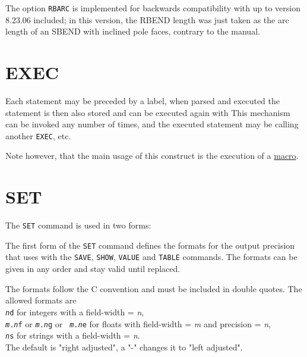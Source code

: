 The option {\tt RBARC} is implemented for backwards compatibility
with \madeight up to version 8.23.06 included; in this version, the
RBEND length was just taken as the arc length of an SBEND with inclined
pole faces, contrary to the \madeight manual.  




\section{EXEC}
\label{sec:exec}
Each statement may be preceded by a label, when parsed and executed the
statement is then also stored and can be executed again with
This mechanism can be invoked any number of times, and the executed
statement may be calling another {\tt EXEC}, etc. 

Note however, that the main usage of this \madx construct is the
execution of a \href{special.html#macro}{macro}.   



\section{SET}
\label{sec:set}
The {\tt SET} command is used in two forms:


The first form of the {\tt SET} command defines the formats for the
output precision that \madx uses with the {\tt SAVE}, {\tt SHOW},
{\tt VALUE} and {\tt TABLE} commands. The formats can be
given in any order and stay valid until replaced. 

The formats follow the C convention and must be included in double
quotes. The allowed formats are \\
{\tt {\it n}d} for integers with a field-width = {\it n}, \\
{\tt {\it m}.{\it n}f} or {\tt {\it m}.{\it n}g} or {\tt {\it
    m}.{\it n}e} for floats with field-width = {\it m} and precision =
       {\it n}, \\
{\tt {\it n}s} for strings with a field-width = {\it n}.\\
The default is "right adjusted", a "-" changes it to "left adjusted".

